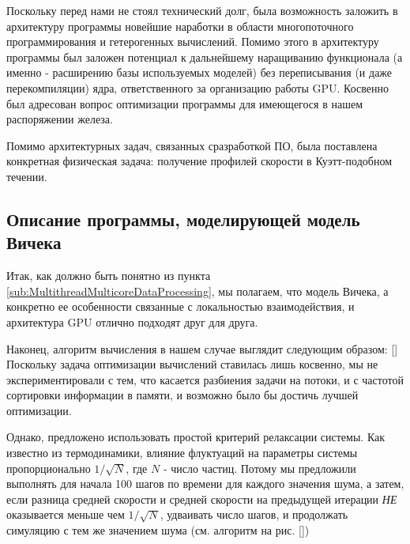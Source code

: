        Поскольку перед нами не стоял технический долг, была возможность заложить в архитектуру программы новейшие наработки в области многопоточного программирования и гетерогенных вычислений. Помимо этого в архитектуру программы был заложен потенциал к дальнейшему наращиванию функционала (а именно - расширению базы используемых моделей) без переписывания (и даже перекомпиляции) ядра, ответственного за организацию работы GPU. Косвенно был адресован вопрос оптимизации программы для имеющегося в нашем распоряжении железа.

        Помимо архитектурных задач, связанных сразработкой ПО, была поставлена конкретная физическая задача: получение профилей скорости в Куэтт-подобном течении.


    \subsection{Описание программы, моделирующей модель Вичека} %
    \label{sub:ViksecModelProgramm}
        Итак, как должно быть понятно из пункта \ref{sub:MultithreadMulticoreDataProcessing}, мы полагаем, что модель Вичека, а конкретно ее особенности связанные с локальностью взаимодействия, и архитектура GPU отлично подходят друг для друга.

        Наконец, алгоритм вычисления в нашем случае выглядит следующим образом: []
        Поскольку задача оптимизации вычислений ставилась лишь косвенно, мы не экспериментировали с тем, что касается разбиения задачи на потоки, и с частотой сортировки информации в памяти, и возможно было бы достичь лучшей оптимизации.
        
        Однако, предложено использовать простой критерий релаксации системы. Как известно из термодинамики, влияние флуктуаций на параметры системы пропорционально $1/\sqrt{N}$, где $N$ - число частиц. Потому мы предложили выполнять для начала 100 шагов по времени для каждого значения шума, а затем, если разница средней скорости и средней скорости на предыдущей итерации \textit{НЕ} оказывается меньше чем $1/\sqrt{N}$, удваивать число шагов, и продолжать симуляцию с тем же значением шума (см. алгоритм на рис. [])

